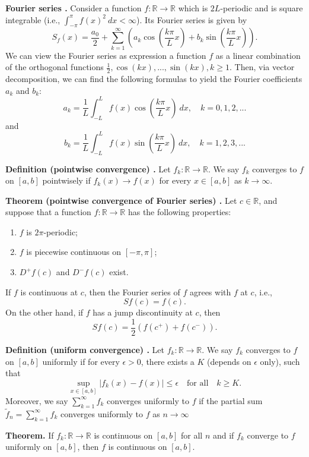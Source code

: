 \begin{shaded}
\textbf{Fourier series \cite{math2111_notes}.} Consider a function $f : \mathbb{R} \to \mathbb{R}$ which is $2 L$-periodic and is square integrable (i.e., $\int_{-\pi}^\pi f(x)^2 \ dx < \infty $). Its Fourier series is given by
$$ S_f(x) = \frac{a_0}{2} + \sum_{k = 1}^{\infty} \left( a_k \cos \left( \frac{k \pi}{L}x \right) + b_k \sin \left( \frac{k \pi}{L}x \right) \right) . $$
We can view the Fourier series as expression a function $f$ as a linear combination of the orthogonal functions $\frac{1}{2}, \cos(kx), ..., \sin(kx), k \geq 1$. Then, via vector decomposition, we can find the following formulas to yield the Fourier coefficients $a_k$ and $b_k$:
$$ a _k = \frac{1}{L} \int_{-L}^L f(x) \cos \left( \frac{k \pi}{L}x \right) \ dx, \quad k = 0, 1, 2, ... $$
and
$$ b _k = \frac{1}{L} \int_{-L}^L f(x) \sin \left( \frac{k \pi}{L}x \right) \ dx, \quad k = 1, 2, 3, ... $$
\end{shaded}

\begin{shaded}
\textbf{Definition (pointwise convergence) \cite{math2111_notes}.} Let $f_k : \mathbb{R} \to \mathbb{R}$. We say $f_k$ converges to $f$ on $[a, b]$ pointwisely if $f_k(x) \to f(x)$ for every $x \in [a, b]$ as $k \to \infty$.
\end{shaded}

\begin{shaded}
\textbf{Theorem (pointwise convergence of Fourier series) \cite{math2111_notes}.} Let $c \in \mathbb{R}$, and suppose that a function $f : \mathbb{R} \to \mathbb{R}$ has the following properties:
\begin{enumerate}
	\item $f$ is $2 \pi$-periodic;
	\item $f$ is piecewise continuous on $[-\pi, \pi]$;
	\item $D^+ f(c)$ and $D^- f(c)$ exist.
\end{enumerate}
If $f$ is continuous at $c$, then the Fourier series of $f$ agrees with $f$ at $c$, i.e.,
$$ S f(c) = f(c) . $$
On the other hand, if $f$ has a jump discontinuity at $c$, then
$$ S f(c) = \frac{1}{2} \left( f(c^+) + f(c^-) \right) . $$
\end{shaded}

\begin{shaded}
\textbf{Definition (uniform convergence) \cite{math2111_notes}.} Let $f_k : \mathbb{R} \to \mathbb{R}$. We say $f_k$ converges to $f$ on $[a, b]$ uniformly if for every $\epsilon > 0$, there exists a $K$ (depends on $\epsilon$ only), such that
$$ \sup_{x \in [a, b]} | f_k(x) - f(x) | \leq \epsilon \quad \text{for all} \quad k \geq K . $$
Moreover, we say $\sum_{k = 1}^{\infty} f_k$ converges uniformly to $f$ if the partial sum $\tilde{f}_n = \sum_{k = 1}^{\infty} f_k$ converges uniformly to $f$ as $n \to \infty$

\textbf{Theorem.} If $f_k : \mathbb{R} \to \mathbb{R}$ is continuous on $[a, b]$ for all $n$ and if $f_k$ converge to $f$ uniformly on $[a, b]$, then $f$ is continuous on $[a, b]$.
\end{shaded}


